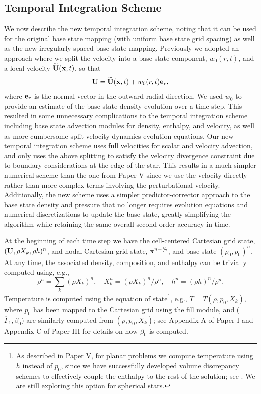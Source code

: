 \documentclass{aastex62}
\newcommand{\sfrac}[2]{\mathchoice
  {\kern0em\raise.5ex\hbox{\the\scriptfont0 #1}\kern-.15em/
   \kern-.15em\lower.25ex\hbox{\the\scriptfont0 #2}}
  {\kern0em\raise.5ex\hbox{\the\scriptfont0 #1}\kern-.15em/
   \kern-.15em\lower.25ex\hbox{\the\scriptfont0 #2}}
  {\kern0em\raise.5ex\hbox{\the\scriptscriptfont0 #1}\kern-.2em/
   \kern-.15em\lower.25ex\hbox{\the\scriptscriptfont0 #2}}
  {#1\!/#2}}
\newcommand{\myhalf}{\sfrac{1}{2}}
\newcommand{\eb}{{\bf{e}}}
\newcommand{\Ub}{{\bf{U}}}
\newcommand{\Ubt}{\widetilde{\Ub}}
\newcommand{\xb}{{\bf{x}}}
\newcommand{\gammaonebar}{\overline{\Gamma}_1}
\begin{document}
\subsection{Temporal Integration Scheme}\label{Sec:Temporal Integration Scheme}
We now describe the new temporal integration scheme, noting that it can be used for the original base state mapping 
(with uniform base state grid spacing) as well as the new irregularly spaced base state mapping.
Previously we adopted an approach where we split the velocity into a base state component, $w_0(r,t)$, 
and a local velocity $\Ubt(\xb,t)$, so that
\begin{equation}
\Ub = \Ubt(\xb,t) + w_0(r,t)\eb_r, \label{eq:velsplit}
\end{equation}
where $\eb_r$ is the normal vector in the outward radial direction.
We used $w_0$ to provide an estimate of the base state density evolution over a time step.
This resulted in some unnecessary complications to the temporal integration scheme including
base state advection modules for density, enthalpy, and velocity, as well as more 
cumbersome split velocity dynamics evolution equations.
Our new temporal integration scheme uses full velocities for scalar and velocity advection,
and only uses the above splitting to satisfy the velocity divergence constraint due to boundary considerations
at the edge of the star.
This results in a much simpler numerical scheme than the one from Paper V 
since we use the velocity directly rather than more complex terms involving the perturbational velocity.
Additionally, the new scheme uses a simpler predictor-corrector approach to the base state density and pressure that no 
longer requires evolution equations and numerical discretizations to update the base state, greatly 
simplifying the algorithm while retaining the same overall second-order accuracy in time.

At the beginning of each time step we have the cell-centered Cartesian grid state,
$(\Ub,\rho X_k,\rho h)^n$, and nodal Cartesian grid state, $\pi^{n-\myhalf}$, and base state $(\rho_0,p_0)^n$.
At any time, the associated density, composition, and enthalpy can be trivially computed using, e.g.,
\begin{equation}
\rho^n = \sum_k(\rho X_k)^n, \quad
X_k^n = (\rho X_k)^n / \rho^n, \quad
h^n = (\rho h)^n / \rho^n.
\end{equation}
Temperature is computed using the equation of state\footnote{As described in Paper V, for planar problems we compute temperature using $h$ instead of $p_0$, since we have successfully developed volume discrepancy schemes to effectively couple the enthalpy to the rest of the solution; see \cite{XRB_I}.  We are still exploring this option for spherical stars.}, e.g.,
$T = T(\rho,p_0,X_k)$, where $p_0$ has been mapped to the Cartesian grid using the fill module,
and ($\gammaonebar,\beta_0)$ are similarly computed from $(\rho,p_0,X_k)$;
see Appendix A of Paper I and Appendix C of Paper III for details on how $\beta_0$ is computed.
\end{document}
